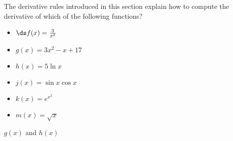 {The derivative rules introduced in this section explain how to compute the derivative of which of the following functions?

\noindent\begin{minipage}[t]{.49\linewidth}
\begin{itemize}
\item	$\ds f(x) = \frac{3}{x^2}$ 
\item	$g(x) = 3x^2-x+17$ 
\item	$h(x) = 5\ln x$ 
\end{itemize}
\end{minipage}
\begin{minipage}[t]{.49\linewidth}
\begin{itemize}
\item	$j(x) = \sin x \cos x$ 
\item		$k(x) = e^{x^2}$
\item	$m(x) = \sqrt{x}$
\end{itemize}
\end{minipage}
}
{$g(x)$ and $h(x)$
}
